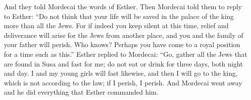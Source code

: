 \begin{biblechapter}
\verse And they told Mordecai the words of Esther.
\verse Then Mordecai told them to reply to Esther: “Do not think that your life will be saved in the palace of the king more than all the Jews.
\verse For if indeed you keep silent at this time, relief and deliverance will arise for the Jews from another place, and you and the family of your father will perish. Who knows? Perhaps you have come to a royal position for a time such as this.”
\verse Esther replied to Mordecai:
\verse “Go, gather all the Jews that are found in Susa and fast for me; do not eat or drink for three days, both night and day. I and my young girls will fast likewise, and then I will go to the king, which is not according to the law; if I perish, I perish.
\verse And Mordecai went away and he did everything that Esther commanded him.
\end{biblechapter}

